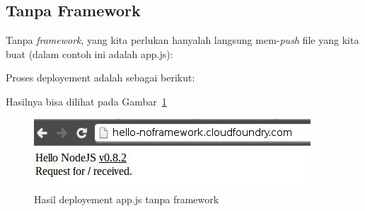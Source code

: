 \subsection{Tanpa Framework}

Tanpa \textit{framework}, yang kita perlukan hanyalah langsung mem-\textit{push} file yang kita buat (dalam contoh ini adalah app.js):

\lstset{language=Javascript,caption=app.js tanpa framework}


Proses deployement adalah sebagai berikut:

\lstset{language=bash,caption=Deployment app.js tanpa framework}


Hasilnya bisa dilihat pada Gambar~\ref{fig:bab-01-hello-no-framework}

  \begin{figure}
    \begin{center}
      \includegraphics[scale=0.5]{images/hello-noframework.jpg}
    \end{center}
    \caption{Hasil deployement app.js tanpa framework}
    \label{fig:bab-01-hello-no-framework}
  \end{figure}
